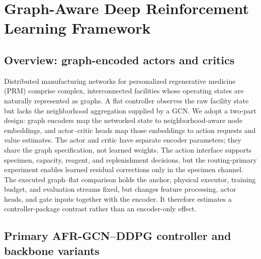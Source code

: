 \documentclass[preprint,review,12pt]{elsarticle}
\begin{document}
\section{Graph-Aware Deep Reinforcement Learning Framework}
\label{sec:method}
\subsection*{Overview: graph-encoded actors and critics}

Distributed manufacturing networks for personalized regenerative medicine (PRM) comprise complex, interconnected facilities whose operating states are naturally represented as graphs. A flat controller observes the raw facility state but lacks the neighborhood aggregation supplied by a GCN. We adopt a two-part design: graph encoders map the networked state to neighborhood-aware node embeddings, and actor--critic heads map those embeddings to action requests and value estimates. The actor and critic have separate encoder parameters; they share the graph specification, not learned weights. The action interface supports specimen, capacity, reagent, and replenishment decisions, but the routing-primary experiment enables learned residual corrections only in the specimen channel. The executed graph--flat comparison holds the anchor, physical executor, training budget, and evaluation streams fixed, but changes feature processing, actor heads, and gate inputs together with the encoder. It therefore estimates a controller-package contrast rather than an encoder-only effect.

\subsection*{Primary AFR-GCN--DDPG controller and backbone variants}
\end{document}
